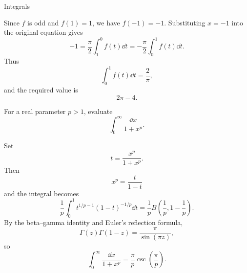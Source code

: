 \begin{expectedproblemgroup}{Integrals}
\begin{expectedsubsolution}
            Since $f$ is odd and $f(1)=1$, we have $f(-1)=-1$. Substituting
            $x=-1$ into the original equation gives
            \[
                -1
                =
                \frac{\pi}{2}\int_1^0f(t)\dd t
                =
                -\frac{\pi}{2}\int_0^1f(t)\dd t.
            \]
            Thus
            \[
                \int_0^1f(t)\dd t=\frac{2}{\pi},
            \]
            and the required value is
            \[
                \boxed{2\pi-4}.
            \]
        \end{expectedsubsolution}

        \begin{expectedsubproblem}
            For a real parameter $p>1$, evaluate
            \[
                \int_0^\infty\frac{\dd x}{1+x^p}.
            \]
        \end{expectedsubproblem}

        \begin{expectedsubsolution}
            Set
            \[
                t=\frac{x^p}{1+x^p}.
            \]
            Then
            \[
                x^p=\frac{t}{1-t}
            \]
            and the integral becomes
            \[
                \frac{1}{p}
                \int_0^1
                t^{1/p-1}(1-t)^{-1/p}\dd t
                =
                \frac{1}{p}
                B\left(\frac{1}{p},1-\frac{1}{p}\right).
            \]
            By the beta--gamma identity and Euler's reflection formula,
            \[
                \Gamma(z)\Gamma(1-z)=\frac{\pi}{\sin(\pi z)},
            \]
            so
            \[
                \boxed{
                    \int_0^\infty\frac{\dd x}{1+x^p}
                    =
                    \frac{\pi}{p}
                    \csc\left(\frac{\pi}{p}\right)
                }.
            \]
        \end{expectedsubsolution}

    \end{expectedproblemgroup}

